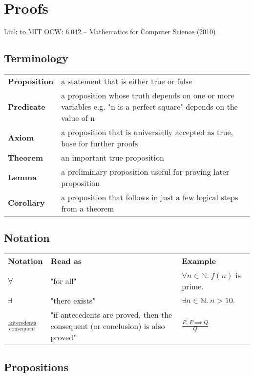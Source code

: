\documentclass[../main.tex]{subfiles}
\begin{document}
\section{Proofs}

Link to MIT OCW: \href{https://ocw.mit.edu/courses/6-042j-mathematics-for-computer-science-fall-2010/}{6.042 -- Mathematics for Computer Science (2010)}

\subsection{Terminology}

\begin{tabular}{ p{2.5cm} p{13cm} }
  \textbf{Proposition} & a statement that is either true or false \\
  \textbf{Predicate}  & a proposition whose truth depends on one or more
  variables e.g. "n is a perfect square" depends on the value of n \\
  \textbf{Axiom} & a proposition that is universially accepted as true, base
  for further proofs \\
  \textbf{Theorem} & an important true proposition \\
  \textbf{Lemma} & a preliminary proposition useful for proving later proposition \\
  \textbf{Corollary} & a proposition that follows in just a few logical steps
  from a theorem \\
\end{tabular}

\subsection{Notation}

\begin{tabular}{ p{2cm} p{8cm} p{4cm} }
  \textbf{Notation} & \textbf{Read as} & \textbf{Example} \\
  $\forall$ & "for all" & $\forall{n}\in\mathbb{N}.\ f(n)$ is prime. \\
  $\exists$ & "there exists" & $\exists{n}\in\mathbb{N}.\ n > 10.$ \\
  $\frac{\text{antecedents}}{\text{consequent}}$ & "if antecedents are proved, then the consequent (or conclusion) is also proved" & $\frac{P,\ P \implies Q}{Q}$ \\
\end{tabular}

\subsection{Propositions}
\end{document}
